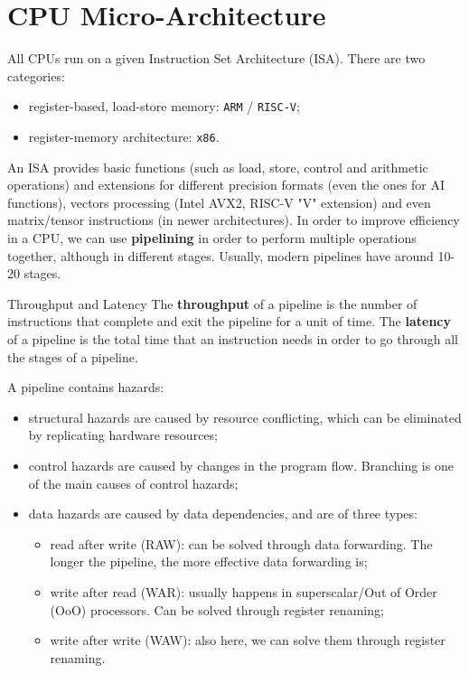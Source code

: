 \chapter{CPU Micro-Architecture}

All CPUs run on a given Instruction Set Architecture (ISA). There are two categories:
\begin{itemize}
    \item register-based, load-store memory: \verb|ARM| / \verb|RISC-V|;
    \item register-memory architecture: \verb|x86|.
\end{itemize}

An ISA provides basic functions (such as load, store, control and arithmetic operations) and extensions for different precision formats (even the ones for AI functions), vectors processing (Intel AVX2, RISC-V "V" extension) and even matrix/tensor instructions (in newer architectures).
\nwl
In order to improve efficiency in a CPU, we can use \textbf{pipelining} in order to perform multiple operations together, although in different stages. Usually, modern pipelines have around 10-20 stages.
\nwl
\begin{definition}{Throughput and Latency}
    The \textbf{throughput} of a pipeline is the number of instructions that complete and exit the pipeline for a unit of time.
    \nwl
    The \textbf{latency} of a pipeline is the total time that an instruction needs in order to go through all the stages of a pipeline.
\end{definition}

A pipeline contains hazards:
\begin{itemize}
    \item structural hazards are caused by resource conflicting, which can be eliminated by replicating hardware resources;
    \item control hazards are caused by changes in the program flow. Branching is one of the main causes of control hazards;
    \item data hazards are caused by data dependencies, and are of three types:
    \begin{itemize}
        \item read after write (RAW): can be solved through data forwarding. The longer the pipeline, the more effective data forwarding is;
        \item write after read (WAR): usually happens in superscalar/Out of Order (OoO) processors. Can be solved through register renaming;
        \item write after write (WAW): also here, we can solve them through register renaming.
    \end{itemize}
\end{itemize} 

